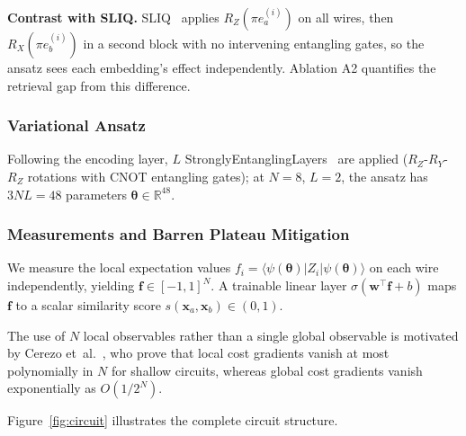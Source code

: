 \documentclass[conference,a4paper]{IEEEtran}
\newcommand{\RX}{R_X}
\newcommand{\RY}{R_Y}
\newcommand{\RZ}{R_Z}
\newcommand{\PauliZ}{Z}
\begin{document}
\textbf{Contrast with SLIQ.}
SLIQ~\cite{silver2023sliq} applies $\RZ(\pi e_a^{(i)})$ on all wires,
then $\RX(\pi e_b^{(i)})$ in a second block with no intervening entangling
gates, so the ansatz sees each embedding's effect independently.
Ablation A2 quantifies the retrieval gap from this difference.

\subsubsection{Variational Ansatz}

Following the encoding layer, $L$ StronglyEntanglingLayers~\cite{bergholm2018pennylane}
are applied ($\RZ$-$\RY$-$\RZ$ rotations with CNOT entangling gates);
at $N{=}8$, $L{=}2$, the ansatz has $3NL=48$ parameters
$\bm{\theta}\in\mathbb{R}^{48}$.

\subsubsection{Measurements and Barren Plateau Mitigation}

We measure the local expectation values
$f_i = \langle\psi(\bm{\theta})|\PauliZ_i|\psi(\bm{\theta})\rangle$
on each wire independently, yielding
$\mathbf{f}\in[-1,1]^N$.
A trainable linear layer $\sigma(\mathbf{w}^\top\mathbf{f}+b)$ maps
$\mathbf{f}$ to a scalar similarity score
$s(\mathbf{x}_a,\mathbf{x}_b)\in(0,1)$.

The use of $N$ local observables rather than a single global observable is
motivated by Cerezo et~al.~\cite{cerezo2021costbarren}, who prove that
local cost gradients vanish at most polynomially in $N$ for shallow circuits,
whereas global cost gradients vanish exponentially as $O(1/2^N)$.

Figure~\ref{fig:circuit} illustrates the complete circuit structure.
\end{document}
